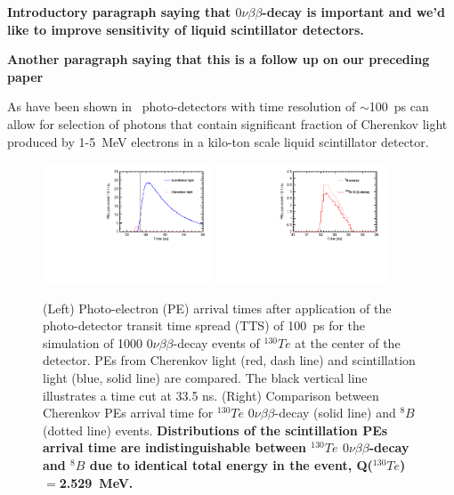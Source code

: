 \documentclass[12pt,twoside,letterpaper]{article}
\newcommand{\vbb}{0\nu\beta\beta}
\newcommand{\Te}{^{130}Te}
\newcommand{\B}{^{8}B}
\begin{document}
{\bf Introductory paragraph saying that $\vbb$-decay is important and we'd like to improve sensitivity of liquid scintillator detectors.}

{\bf Another paragraph saying that this is a follow up on our preceding paper~\cite{Directionality}}
  
As have been shown in~\cite{Directionality} photo-detectors with time resolution of $\sim$100~ps can allow for selection of photons that contain significant fraction of Cherenkov light produced by 1-5~MeV electrons in a kilo-ton scale liquid scintillator detector.

\begin{figure}[htb]
\centering
\includegraphics[angle=0,width=0.45\textwidth]{plots/hT_Te130.pdf}
\includegraphics[angle=0,width=0.45\textwidth]{plots/hTche_Te130_B8.pdf}
\caption{(Left) Photo-electron (PE) arrival times after application of the photo-detector transit time spread (TTS) of 100~ps for the simulation of 1000 $\vbb$-decay events of $\Te$ at the center of the detector. PEs from Cherenkov light (red, dash line) and scintillation light (blue, solid
line) are compared. The black vertical line illustrates a time cut at 33.5 ns. (Right) Comparison between Cherenkov PEs arrival time for $\Te$ $\vbb$-decay (solid line) and $\B$ (dotted line) events. {\bf Distributions of the scintillation PEs arrival time are indistinguishable between $\Te$ $\vbb$-decay and $\B$ due to identical total energy in the event, Q($\Te$)$=$2.529~MeV.} }
\label{fig:Arrival_time}
\end{figure}
\end{document}
